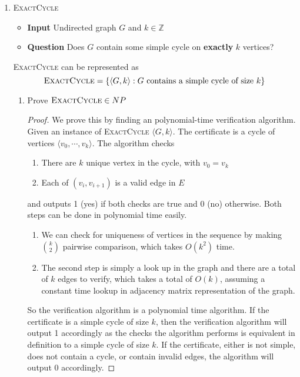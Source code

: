 \documentclass[11pt]{article}
\begin{document}
\begin{enumerate}
    \item \textsc{ExactCycle}
    \begin{itemize}
        \item \textbf{Input} Undirected graph $G$ and $k\in \mathbb{Z}$
        \item \textbf{Question} Does $G$ contain some simple cycle on \textbf{exactly} $k$ vertices?
    \end{itemize}
    \begin{solution}
        \textsc{ExactCycle} can be represented as 
        \[
            \textsc{ExactCycle} = \{ \langle G, k \rangle: \text{$G$ contains a simple cycle of size  } k \}
        \]
        \begin{enumerate}
            \item Prove $\textsc{ExactCycle} \in NP$
            \begin{proof}
                We prove this by finding an polynomial-time verification algorithm. Given an instance of \textsc{ExactCycle} $\langle G, k\rangle$. The certificate is a cycle of vertices $\langle v_0, \cdots, v_k \rangle$. The algorithm checks 
                \begin{enumerate}
                    \item There are $k$ unique vertex in the cycle, with $v_0 = v_{k}$
                    \item Each of $(v_i, v_{i+1})$ is a valid edge in $E$  
                \end{enumerate}
                and outputs 1 (yes) if both checks are true and 0 (no) otherwise. Both steps can be done in polynomial time easily.
                \begin{enumerate}
                    \item We can check for uniqueness of vertices in the sequence by making $\binom{k}{2}$ pairwise comparison, which takes $O(k^2)$ time. 
                    \item The second step is simply a look up in the graph and there are a total of $k$ edges to verify, which takes a total of $O(k)$, assuming a constant time lookup in adjacency matrix representation of the graph.
                \end{enumerate}
                So the verification algorithm is a polynomial time algorithm. If the certificate is a simple cycle of size $k$, then the verification algorithm will output 1 accordingly as the checks the algorithm performs is equivalent in definition to a simple cycle of size $k$. If the certificate, either is not simple, does not contain a cycle, or contain invalid edges, the algorithm will output 0 accordingly.

\end{proof}
\end{enumerate}
\end{solution}
\end{enumerate}
\end{document}
